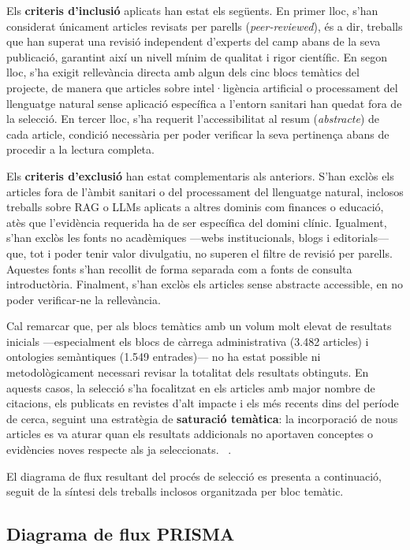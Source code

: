 \documentclass[11pt,a4paper]{article}
\begin{document}
Els \textbf{criteris d'inclusió} aplicats han estat els següents. En primer lloc, s'han considerat únicament articles revisats per parells (\textit{peer-reviewed}), és a dir, treballs que han superat una revisió independent d'experts del camp abans de la seva publicació, garantint així un nivell mínim de qualitat i rigor científic. En segon lloc, s'ha exigit rellevància directa amb algun dels cinc blocs temàtics del projecte, de manera que articles sobre intel·ligència artificial o processament del llenguatge natural sense aplicació específica a l'entorn sanitari han quedat fora de la selecció. En tercer lloc, s'ha requerit l'accessibilitat al resum (\textit{abstracte}) de cada article, condició necessària per poder verificar la seva pertinença abans de procedir a la lectura completa.

Els \textbf{criteris d'exclusió} han estat complementaris als anteriors. S'han exclòs els articles fora de l'àmbit sanitari o del processament del llenguatge natural, inclosos treballs sobre RAG o LLMs aplicats a altres dominis com finances o educació, atès que l'evidència requerida ha de ser específica del domini clínic. Igualment, s'han exclòs les fonts no acadèmiques ---webs institucionals, blogs i editorials--- que, tot i poder tenir valor divulgatiu, no superen el filtre de revisió per parells. Aquestes fonts s'han recollit de forma separada com a fonts de consulta introductòria. Finalment, s'han exclòs els articles sense abstracte accessible, en no poder verificar-ne la rellevància.

Cal remarcar que, per als blocs temàtics amb un volum molt elevat de resultats inicials ---especialment els blocs de càrrega administrativa (3.482 articles) i ontologies semàntiques (1.549 entrades)--- no ha estat possible ni metodològicament necessari revisar la totalitat dels resultats obtinguts. En aquests casos, la selecció s'ha focalitzat en els articles amb major nombre de citacions, els publicats en revistes d'alt impacte i els més recents dins del període de cerca, seguint una estratègia de \textbf{saturació temàtica}: la incorporació de nous articles es va aturar quan els resultats addicionals no aportaven conceptes o evidències noves respecte als ja seleccionats. ~\cite{page2021prisma}.

El diagrama de flux resultant del procés de selecció es presenta a continuació, seguit de la síntesi dels treballs inclosos organitzada per bloc temàtic.


\subsection*{Diagrama de flux PRISMA}
\end{document}
